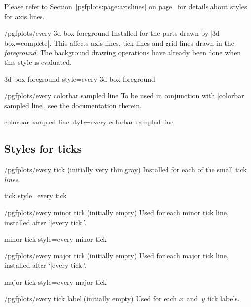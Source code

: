 \noindent Please refer to Section~\ref{pgfplots:page:axislines} on
page~\pageref{pgfplots:page:axislines} for details about styles for axis lines.

\begin{stylekey}{/pgfplots/every 3d box foreground}
    Installed for the parts drawn by |3d box=complete|. This affects axis
    lines, tick lines and grid lines drawn in the \emph{foreground}. The
    background drawing operations have already been done when this style is
    evaluated.
\end{stylekey}

\pgfplotsshortstylekey 3d box foreground style=every 3d box foreground\pgfeov

\begin{stylekey}{/pgfplots/every colorbar sampled line}
    To be used in conjunction with |colorbar sampled line|, see the
    documentation therein.
\end{stylekey}

\pgfplotsshortstylekey colorbar sampled line style=every colorbar sampled line\pgfeov


\subsection*{Styles for ticks}

\begin{stylekey}{/pgfplots/every tick (initially very thin,gray)}
    Installed for each of the small tick \emph{lines}.
\end{stylekey}

\pgfplotsshortstylekey tick style=every tick\pgfeov

\begin{stylekey}{/pgfplots/every minor tick  (initially empty)}
    Used for each minor tick line, installed after `|every tick|'.
\end{stylekey}

\pgfplotsshortstylekey minor tick style=every minor tick\pgfeov

\begin{stylekey}{/pgfplots/every major tick (initially empty)}
    Used for each major tick line, installed after `|every tick|'.
\end{stylekey}

\pgfplotsshortstylekey major tick style=every major tick\pgfeov

\begin{stylekey}{/pgfplots/every tick label (initially empty)}
    Used for each $x$~and~$y$ tick labels.
\end{stylekey}


